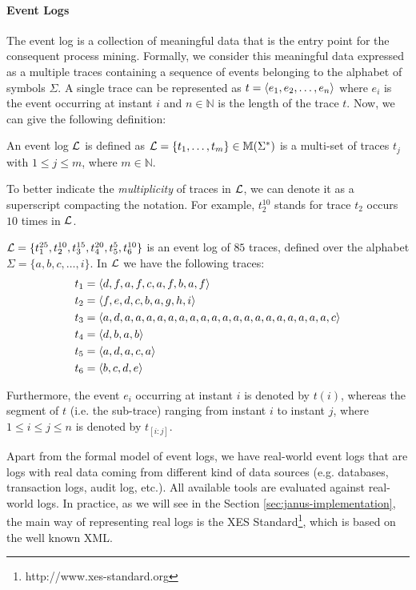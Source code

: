 \paragraph{Event Logs}
The event log is a collection of meaningful data that is the entry point for the consequent process mining. Formally, we consider this meaningful data expressed as a multiple traces containing a sequence of events belonging to the alphabet of symbols $\Sigma$. A single trace can be represented as $t = \langle e_1,e_2,\dots,e_n \rangle$ where $e_i$ is the event occurring at instant $i$ and $n \in \mathbb{N}$ is the length of the trace $t$.  Now, we can give the following definition:
\begin{definition}
An event log $\mathcal{L}$ is defined as $\mathcal{L} = \{t_1,\dots,t_m\} \in \mathbb{M} (\Sigma^*)$ is a multi-set of traces $t_j$ with $1 \le j \le m$, where $m \in \mathbb{N}$.
\end{definition}
To better indicate the \textit{multiplicity} of traces in $\mathcal{L}$, we can denote it as a superscript compacting the notation. For example, $t_{2}^{10}$ stands for trace $t_2$ occurs $10$ times in $\mathcal{L}$.
\begin{example}\label{ex:traces}
$\mathcal{L} = \{t_{1}^{25},t_{2}^{10},t_{3}^{15},t_{4}^{20},t_{5}^{5},t_{6}^{10}\}$ is an event log of $85$ traces, defined over the alphabet $\Sigma = \{a,b,c,\dots, i \} $. In $ \mathcal{L} $ we have the following traces:
\begin{align*}
t_1 &= \langle d,f,a,f,c,a,f,b,a,f \rangle\\
t_2 &= \langle f,e,d,c,b,a,g,h,i \rangle\\
t_3 &= \langle a,d,a,a,a,a,a,a,a,a,a,a,a,a,a,a,a,a,a,a,a,c \rangle\\
t_4 &= \langle d,b,a,b \rangle\\
t_5 &= \langle a,d,a,c,a \rangle\\
t_6 &= \langle b,c,d,e \rangle
\end{align*}
\end{example}
Furthermore, the event $e_i$ occurring at instant $i$ is denoted by $t(i)$, whereas the segment of $t$ (i.e. the sub-trace) ranging from instant $i$ to instant $j$, where $1 \le i \le j \le n$ is denoted by $t_{[i:j]}$.

Apart from the formal model of event logs, we have real-world event logs that are logs with real data coming from different kind of data sources (e.g. databases, transaction logs, audit log, etc.). All available tools are evaluated against real-world logs. In practice, as we will see in the Section \ref{sec:janus-implementation}, the main way of representing real logs is the XES Standard\footnote{http://www.xes-standard.org}, which is based on the well known XML.
